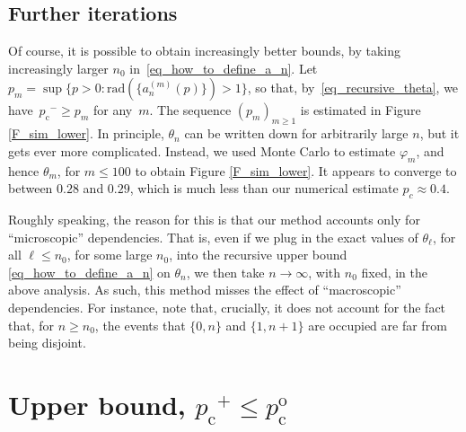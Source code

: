 \documentclass[pdflatex,sn-mathphys-num]{sn-jnl}%
\newcommand{\1}{{\ensuremath{\mathbf{1}}} }
\newcommand{\pc}{\ensuremath{p_{\mathrm{c}} }}
\newcommand{\pco}{\ensuremath{p_{\mathrm{c}}^{\mathrm{o}} }}
\theoremstyle{thmstyleone}%
\theoremstyle{thmstyletwo}%
\theoremstyle{thmstylethree}%
\begin{document}
\subsection{Further iterations}
\label{subsec:further}
Of course, it is possible to
obtain increasingly  better bounds, 
by taking increasingly larger $n_0$ in~\eqref{eq_how_to_define_a_n}. 
Let~$p_m = \sup\{p > 0: \mathrm{rad}(\{a_n^{(m)}(p)\}) > 1\}$, so that, by~\eqref{eq_recursive_theta}, we have~$\pc^- \ge p_m$ for any~$m$.
The sequence $(p_m)_{m\ge1}$ is estimated in Figure \ref{F_sim_lower}. In principle, $\theta_n$ can be written down for arbitrarily large $n$, but it gets ever more complicated. Instead, we used Monte Carlo to estimate $\varphi_m$, and hence $\theta_m$, for $m \le 100$ to obtain Figure \ref{F_sim_lower}. It appears to converge to between $0.28$ and $0.29$, which is much less than our 
numerical estimate $p_c\approx 0.4$.


Roughly speaking, the reason for this 
is that our method accounts only for 
``microscopic'' dependencies. 
That is, even if we plug in the exact
values of $\theta_\ell$, for all $\ell\le n_0$, 
for some large $n_0$, 
into the recursive upper bound 
\eqref{eq_how_to_define_a_n}
on $\theta_n$, we then take $n\to\infty$,
with $n_0$ fixed, in the above analysis. 
As such, this method misses the effect of ``macroscopic'' dependencies. 
For instance, 
note that, crucially, 
it does not account for the fact that, for $n\ge n_0$, the events that $\{0,n\}$ and $\{1,n+1\}$ are occupied are far from being disjoint.






\section{Upper bound, \texorpdfstring{$\pc^+\le \pco$}{pc+<=pco}}
\label{sec:upper}
\end{document}
